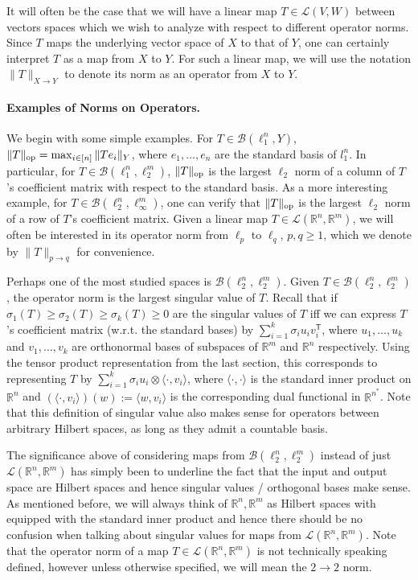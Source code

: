 \documentclass[11pt]{article}
\theoremstyle{plain}
\theoremstyle{plain}
\newcommand{\T}{\ensuremath{\mathsf{T}}}
\newcommand{\R}{\ensuremath{\mathbb{R}}}
\newcommand{\pr}[2]{\langle{#1, #2}\rangle}
\begin{document}
It will often be the case that we will have a linear map $T \in
\mathcal{L}(V,W)$ between vectors spaces which we wish to analyze with respect
to different operator norms. Since $T$ maps the underlying vector space of $X$
to that of $Y$, one can certainly interpret $T$ as a map from $X$ to $Y$. For
such a linear map, we will use the notation $\|T\|_{X \rightarrow Y}$ to denote
its norm as an operator from $X$ to $Y$.

\paragraph{\bf Examples of Norms on Operators.}

We begin with some simple examples. For $T \in \mathcal{B}(\ell_1^n,Y)$,
$\|T\|_{\rm op} = \max_{i \in [n]} \|Te_i\|_Y$, where $e_1,\dots,e_n$ are the
standard basis of $l_1^n$. In particular, for $T \in
\mathcal{B}(\ell_1^n,\ell_2^m)$, $\|T\|_{\rm op}$ is the largest $\ell_2$ norm
of a column of $T$'s coefficient matrix with respect to the standard basis. As a
more interesting example, for $T \in \mathcal{B}(\ell_2^n,\ell_\infty^m)$, one
can verify that $\|T\|_{\rm op}$ is the largest $\ell_2$ norm of a row of $T$'s
coefficient matrix. Given a linear map $T \in \mathcal{L}(\R^n,\R^m)$, we will
often be interested in its operator norm from $\ell_p$ to $\ell_q$, $p,q \geq
1$, which we denote by $\|T\|_{p \rightarrow q}$ for convenience. 

Perhaps one of the most studied spaces is $\mathcal{B}(\ell_2^n,\ell^m_2)$.
Given $T \in \mathcal{B}(\ell_2^n,\ell_2^m)$, the operator norm is the largest
singular value of $T$. Recall that if $\sigma_1(T) \geq \sigma_2(T) \geq
\sigma_k(T) \geq 0$ are the singular values of $T$ iff we can express $T$'s
coefficient matrix (w.r.t. the standard bases) by $\sum_{i=1}^k \sigma_i u_i
v_i^\T$, where $u_1,\dots,u_k$ and $v_1,\dots,v_k$ are orthonormal bases of
subspaces of $\R^m$ and $\R^n$ respectively. Using the tensor product
representation from the last section, this corresponds to representing $T$ by
$\sum_{i=1}^k \sigma_i u_i \otimes \pr{\cdot}{v_i}$, where $\pr{\cdot}{\cdot}$
is the standard inner product on $\R^n$ and $(\pr{\cdot}{v_i})(w) := \pr{w}{v_i}$
is the corresponding dual functional in $\R^{n^*}$. Note that this definition
of singular value also makes sense for operators between arbitrary Hilbert
spaces, as long as they admit a countable basis.  

The significance above of considering maps from
$\mathcal{B}(\ell_2^n,\ell_2^m)$ instead of just $\mathcal{L}(\R^n,\R^m)$ has
simply been to underline the fact that the input and output space are Hilbert
spaces and hence singular values / orthogonal bases make sense. As mentioned
before, we will always think of $\R^n, \R^m$ as Hilbert spaces with equipped
with the standard inner product and hence there should be no confusion when
talking about singular values for maps from $\mathcal{L}(\R^n,\R^m)$. Note that
the operator norm of a map $T \in \mathcal{L}(\R^n,\R^m)$ is not technically
speaking defined, however unless otherwise specified, we will mean the $2
\rightarrow 2$ norm. 
\end{document}

